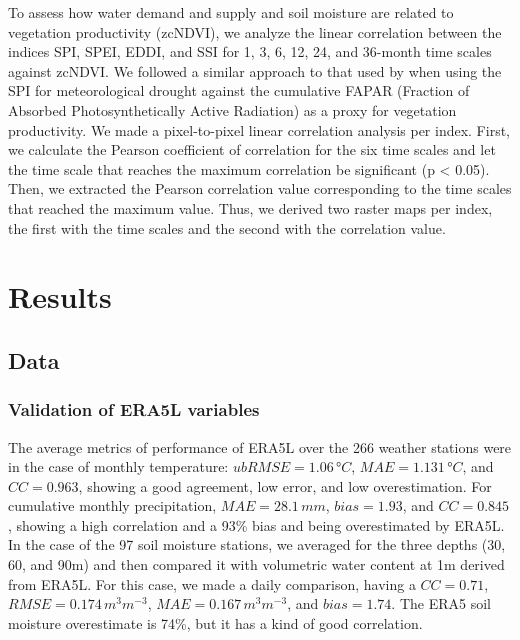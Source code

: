 \documentclass[
  number,
  preprint,
  3p,
  onecolumn]{elsarticle}
\begin{document}
To assess how water demand and supply and soil moisture are related to
vegetation productivity (zcNDVI), we analyze the linear correlation
between the indices SPI, SPEI, EDDI, and SSI for 1, 3, 6, 12, 24, and
36-month time scales against zcNDVI. We followed a similar approach to
that used by \citep{Meroni2016} when using the SPI for meteorological
drought against the cumulative FAPAR (Fraction of Absorbed
Photosynthetically Active Radiation) as a proxy for vegetation
productivity. We made a pixel-to-pixel linear correlation analysis per
index. First, we calculate the Pearson coefficient of correlation for
the six time scales and let the time scale that reaches the maximum
correlation be significant (p \textless{} 0.05). Then, we extracted the
Pearson correlation value corresponding to the time scales that reached
the maximum value. Thus, we derived two raster maps per index, the first
with the time scales and the second with the correlation value.

\hypertarget{results}{%
\section{Results}\label{results}}

\hypertarget{data-1}{%
\subsection{Data}\label{data-1}}

\hypertarget{validation-of-era5l-variables-1}{%
\subsubsection{Validation of ERA5L
variables}\label{validation-of-era5l-variables-1}}

The average metrics of performance of ERA5L over the 266 weather
stations were in the case of monthly temperature: \(ubRMSE=1.06\,°C\),
\(MAE=1.131\,°C\), and \(CC=0.963\), showing a good agreement, low
error, and low overestimation. For cumulative monthly precipitation,
\(MAE=28.1\,mm\), \(bias=1.93\), and \(CC=0.845\), showing a high
correlation and a 93\% bias and being overestimated by ERA5L. In the
case of the 97 soil moisture stations, we averaged for the three depths
(30, 60, and 90m) and then compared it with volumetric water content at
1m derived from ERA5L. For this case, we made a daily comparison, having
a \(CC=0.71\), \(RMSE=0.174\,m^3m^{-3}\), \(MAE=0.167\,m^3m^{-3}\), and
\(bias=1.74\). The ERA5 soil moisture overestimate is 74\%, but it has a
kind of good correlation.
\end{document}
